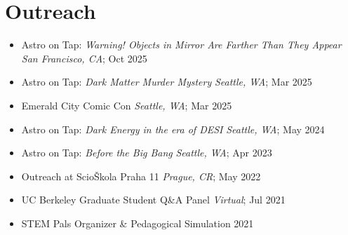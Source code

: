 \section{Outreach}
\begin{itemize}
    \item Astro on Tap: \textit{Warning! Objects in Mirror Are Farther Than They Appear} \hfill \textit{San Francisco, CA}; Oct 2025

    \item Astro on Tap: \textit{Dark Matter Murder Mystery} \hfill \textit{Seattle, WA}; Mar 2025

    \item Emerald City Comic Con \hfill \textit{Seattle, WA}; Mar 2025

    \item Astro on Tap: \textit{Dark Energy in the era of DESI} \hfill \textit{Seattle, WA}; May 2024

    \item Astro on Tap: \textit{Before the Big Bang} \hfill \textit{Seattle, WA}; Apr 2023

    \item Outreach at ScioŠkola Praha 11 \hfill \textit{Prague, CR}; May 2022

    \item UC Berkeley Graduate Student Q\&A Panel \hfill \textit{Virtual}; Jul 2021

    \item STEM Pals Organizer \& Pedagogical Simulation \hfill 2021


\end{itemize}
